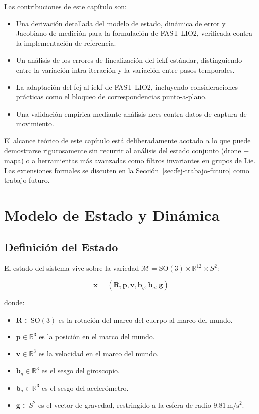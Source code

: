 Las contribuciones de este capítulo son:

\begin{itemize}
    \item Una derivación detallada del modelo de estado, dinámica de error y
    Jacobiano de medición para la formulación de FAST-LIO2, verificada contra
    la implementación de referencia.
    \item Un análisis de los errores de linealización del \gls{iekf} estándar,
    distinguiendo entre la variación intra-iteración y la variación entre pasos
    temporales.
    \item La adaptación del \gls{fej} al \gls{iekf} de FAST-LIO2, incluyendo
    consideraciones prácticas como el bloqueo de correspondencias punto-a-plano.
    \item Una validación empírica mediante análisis \gls{nees} contra datos de
    captura de movimiento.
\end{itemize}

El alcance teórico de este capítulo está deliberadamente acotado a lo que puede
demostrarse rigurosamente sin recurrir al análisis del estado conjunto
(drone + mapa) o a herramientas más avanzadas como filtros invariantes en
grupos de Lie. Las extensiones formales se discuten en la
Sección~\ref{sec:fej-trabajo-futuro} como trabajo futuro.

\section{Modelo de Estado y Dinámica}
\label{sec:fej-modelo-estado}

\subsection{Definición del Estado}
\label{sec:fej-estado}

El estado del sistema vive sobre la variedad
$\mathcal{M} = \mathrm{SO}(3) \times \mathbb{R}^{12} \times S^2$:

\begin{equation}
\mathbf{x} = (\mathbf{R}, \mathbf{p}, \mathbf{v}, \mathbf{b}_g, \mathbf{b}_a, \mathbf{g})
\label{eq:state-vector}
\end{equation}

donde:

\begin{itemize}
    \item $\mathbf{R} \in \mathrm{SO}(3)$ es la rotación del marco del cuerpo al
    marco del mundo.
    \item $\mathbf{p} \in \mathbb{R}^3$ es la posición en el marco del mundo.
    \item $\mathbf{v} \in \mathbb{R}^3$ es la velocidad en el marco del mundo.
    \item $\mathbf{b}_g \in \mathbb{R}^3$ es el sesgo del giroscopio.
    \item $\mathbf{b}_a \in \mathbb{R}^3$ es el sesgo del acelerómetro.
    \item $\mathbf{g} \in S^2$ es el vector de gravedad, restringido a la esfera
    de radio $9.81\,\mathrm{m/s^2}$.
\end{itemize}

